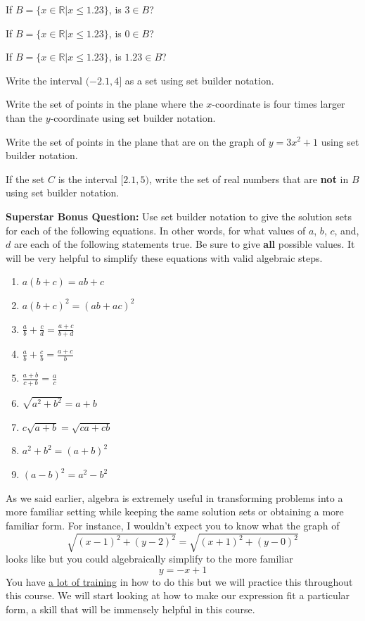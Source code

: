 \bq\label{s1}
\be
\item If $B=\{ x \in \mathbb{R} | x \leq 1.23\}$, is $3 \in B$?
\item If $B=\{ x \in \mathbb{R} | x \leq 1.23\}$, is $0 \in B$?
\item If $B=\{ x \in \mathbb{R} | x \leq 1.23\}$, is $1.23 \in B$?
\item Write the interval $(-2.1,4]$ as a set using set builder notation.
\item Write the set of points in the plane where the $x$-coordinate is four times larger than the $y$-coordinate using set builder notation.
\item Write the set of points in the plane that are on the graph of $y=3x^2+1$ using set builder notation.
\item If the set $C$ is the interval $[2.1,5)$, write the set of real numbers that are \textbf{not} in $B$ using set builder notation.
\ee
\eq

\textbf{Superstar Bonus Question:} Use set builder notation to give the solution sets for each of the following equations. In other words, for what values of $a$, $b$, $c$, and, $d$ are each of the following statements true. Be sure to give \textbf{all} possible values. It will be very helpful to simplify these equations with valid algebraic steps.
\begin{enumerate}
\item $a(b+c)=ab+c$
\item $a(b+c)^2 =(ab+ac)^2$
\item $\frac{a}{b}+\frac{c}{d} =\frac{a+c}{b+d}$
\item $\frac{a}{b}+\frac{c}{b} =\frac{a+c}{b}$
\item $\frac{a+b}{c+b}=\frac{a}{c}$
\item $\sqrt{a^2+b^2}=a+b$
\item $c \sqrt{a+b}=\sqrt{ca+cb}$
\item $a^2+b^2=(a+b)^2$
\item $(a-b)^2=a^2-b^2$
\end{enumerate}


\begin{info}
As we said earlier, algebra is extremely useful in transforming problems into a more familiar setting while keeping the same solution sets or obtaining a more familiar form. For instance, I wouldn't expect you to know what the graph of $$\sqrt{(x-1)^2+(y-2)^2}=\sqrt{(x+1)^2+(y-0)^2}$$ looks like but you could algebraically simplify to the more familiar $$y=-x+1$$
You have \underline{a lot of training} in how to do this but we will practice this throughout this course. We will start looking at how to make our expression fit a particular form, a skill that will be immensely helpful in this course.
\end{info}

